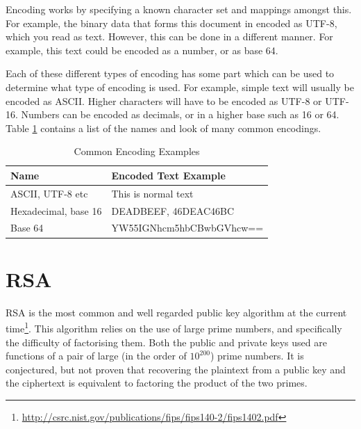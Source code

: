 				Encoding works by specifying a known character set and mappings amongst this. 
				For example, the binary data that forms this document in encoded as UTF-8, which you read as text. 
				However, this can be done in a different manner. 
				For example, this text could be encoded as a number, or as base 64. 

				Each of these different types of encoding has some part which can be used to determine what type of encoding is used. 
				For example, simple text will usually be encoded as ASCII. 
				Higher characters will have to be encoded as UTF-8 or UTF-16. 
				Numbers can be encoded as decimals, or in a higher base such as 16 or 64. 
				Table \ref{tab:Encodings} contains a list of the names and look of many common encodings. 
				\begin{table}[htb]
					\centering
				\begin{adjustbox}{max width=1\textwidth}
					\begin{tabular}{| l | l |}
						\hline
						\textbf{Name} & \textbf{Encoded Text Example} \\ \hline
						ASCII, UTF-8 etc & This is normal text \\ \hline
						Hexadecimal, base 16 & DEADBEEF, 46DEAC46BC \\ \hline
						Base 64 & YW55IGNhcm5hbCBwbGVhcw== \\ \hline
					\end{tabular}
				\end{adjustbox}
					\caption{Common Encoding Examples}
					\label{tab:Encodings}
				\end{table}
	\section{RSA}
		RSA is the most common and well regarded public key algorithm at the current time\footnote{\url{http://csrc.nist.gov/publications/fips/fips140-2/fips1402.pdf}}. 
		This algorithm relies on the use of large prime numbers, and specifically the difficulty of factorising them. 
		Both the public and private keys used are functions of a pair of large (in the order of $10^{200}$) prime numbers. 
		It is conjectured, but not proven that recovering the plaintext from a public key and the ciphertext is equivalent to factoring the product of the two primes. 

